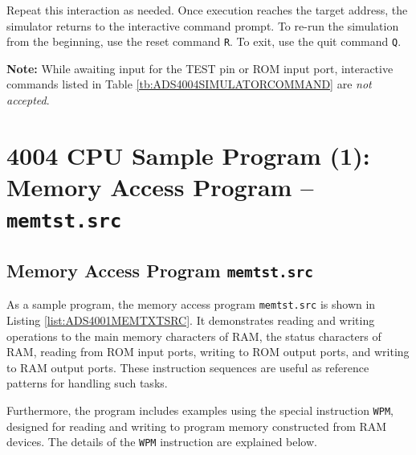 Repeat this interaction as needed.  
Once execution reaches the target address, the simulator returns to the interactive command prompt.  
To re-run the simulation from the beginning, use the reset command \texttt{R}.  
To exit, use the quit command \texttt{Q}.

\textbf{Note:} While awaiting input for the TEST pin or ROM input port, interactive commands listed in Table \ref{tb:ADS4004SIMULATORCOMMAND} are \textit{not accepted}.

\section{4004 CPU Sample Program (1): Memory Access Program – \texttt{memtst.src}}
\subsection{Memory Access Program \texttt{memtst.src}}
As a sample program, the memory access program \texttt{memtst.src} is shown in Listing \ref{list:ADS4001MEMTXTSRC}.  
It demonstrates reading and writing operations to the main memory characters of RAM, the status characters of RAM, reading from ROM input ports, writing to ROM output ports, and writing to RAM output ports.  
These instruction sequences are useful as reference patterns for handling such tasks.

Furthermore, the program includes examples using the special instruction \texttt{WPM}, designed for reading and writing to program memory constructed from RAM devices.  
The details of the \texttt{WPM} instruction are explained below.

